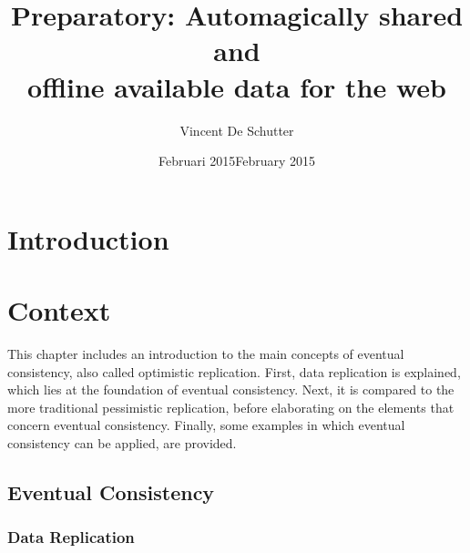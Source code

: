 \documentclass[a4paper,12pt]{report}
\author{Vincent De Schutter}
\title{Preparatory: Automagically shared and \\offline available data for the web}
\date{Februari 2015}
\begin{document}


\date{February 2015}

\maketitlepage

\tableofcontents
\newpage

\chapter{Introduction}\label{cha:Introduction} %
\chapter{Context}\label{cha:Context} %

This chapter includes an introduction to the main concepts of eventual consistency, also called optimistic replication. First, data replication is explained, which lies at the foundation of eventual consistency. Next, it is compared to the more traditional pessimistic replication, before elaborating on the elements that concern eventual consistency. Finally, some examples in which eventual consistency can be applied, are provided.

\section{Eventual Consistency}\label{sec:EventualConsistency}


\subsection{Data Replication}
\end{document}

